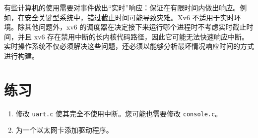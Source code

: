 有些计算机的使用需要对事件做出“实时”响应：保证在有限时间内做出响应。例如，在安全关键型系统中，错过截止时间可能导致灾难。Xv6 不适用于实时环境。除其他问题外，xv6 的调度器在决定接下来运行哪个进程时不考虑实时截止时间，并且 xv6 存在禁用中断的长内核代码路径，因此它可能无法快速响应中断。实时操作系统不仅必须解决这些问题，还必须以能够分析最坏情况响应时间的方式进行构建。

\section{练习}

\begin{enumerate}

\item 修改 {\tt uart.c} 使其完全不使用中断。您可能也需要修改 {\tt console.c}。

\item 为一个以太网卡添加驱动程序。

\end{enumerate}
